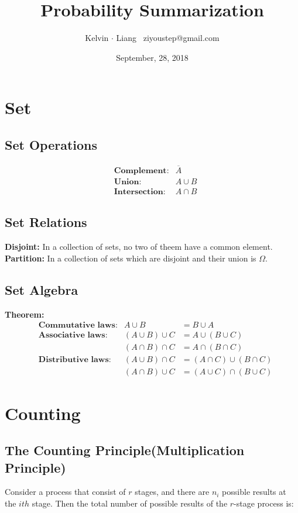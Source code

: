 \documentclass[11pt]{article}
\begin{document}
\title{Probability Summarization}
\author{Kelvin $\cdot$ Liang \, ziyoustep@gmail.com}
\date{September, 28, 2018}
\maketitle

\tableofcontents

\section{Set}
\subsection{Set Operations}
\begin{align*}
    &\textbf{Complement:} &\overline{A}\\
    &\textbf{Union:} &A \cup B\\
    &\textbf{Intersection:} &A \cap B
\end{align*}

\subsection{Set Relations}
\textbf{Disjoint:} In a collection of sets, no two of theem have a common element.\\
\textbf{Partition:} In a collection of sets which are disjoint and their union is $\Omega$.

\subsection{Set Algebra}
\textbf{Theorem:}
\begin{align*}
    &\textbf{Commutative laws:} &A \cup B &= B \cup A\\
    &\textbf{Associative laws:} &(A \cup B) \cup C &= A \cup (B \cup C)\\
    &  &(A \cap B) \cap C &= A \cap (B \cap C)\\
    &\textbf{Distributive laws:} &(A \cup B) \cap C &= (A \cap C) \cup (B \cap C)\\
    &  &(A \cap B) \cup C &= (A \cup C) \cap (B \cup C)    
\end{align*}

\section{Counting}
\subsection{The Counting Principle(Multiplication Principle)}
Consider a process that consist of $r$ stages, and there are $n_i$ possible results at the $ith$ stage. Then the total number of possible results of the $r$-stage process is:
\end{document}
